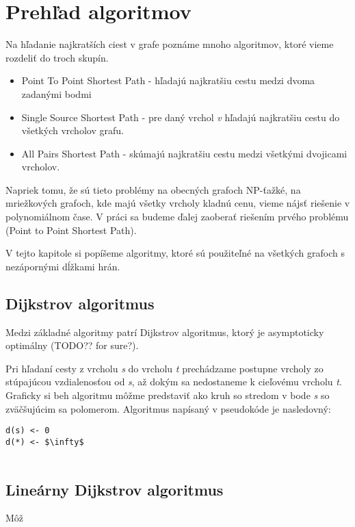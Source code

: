 \chapter{Prehľad algoritmov}
Na hľadanie najkratších ciest v grafe poznáme mnoho algoritmov, ktoré vieme rozdeliť do troch skupín.


\begin{itemize}
\item Point To Point Shortest Path - hľadajú najkratšiu cestu medzi dvoma zadanými bodmi
\item Single Source Shortest Path - pre daný vrchol {\sl v} hľadajú najkratšiu cestu do všetkých vrcholov grafu.
\item All Pairs Shortest Path - skúmajú najkratšiu cestu medzi všetkými dvojicami vrcholov.
\end{itemize}

Napriek tomu, že sú tieto problémy na obecných grafoch NP-ťažké, na mriežkových grafoch, kde majú všetky vrcholy kladnú cenu, vieme nájsť riešenie v polynomiálnom čase.
V práci sa budeme ďalej zaoberať riešením prvého problému (Point to Point Shortest Path).

V tejto kapitole si popíšeme algoritmy, ktoré sú použiteľné na všetkých grafoch 
s nezápornými dĺžkami hrán.

\section{Dijkstrov algoritmus}
Medzi základné algoritmy patrí Dijkstrov algoritmus, ktorý je asymptoticky optimálny (TODO?? for sure?).

Pri hľadaní cesty z vrcholu {\sl s} do vrcholu {\sl t} prechádzame postupne vrcholy zo stúpajúcou vzdialenosťou od {\sl s}, až dokým sa nedostaneme k cieľovému vrcholu {\sl t}.
Graficky si beh algoritmu môžme predstaviť ako kruh so stredom v bode {\sl s} so zväčšujúcim sa polomerom. Algoritmus napísaný v pseudokóde je nasledovný:

\begin{lstlisting}
d(s) <- 0
d(*) <- $\infty$


\end{lstlisting}




\section{Lineárny Dijkstrov algoritmus}
Môž

